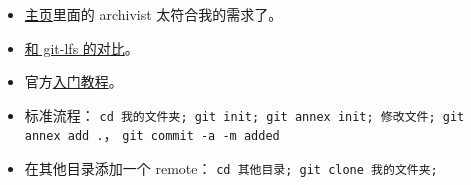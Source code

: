 
\begin{itemize}
\item \href{https://git-annex.branchable.com/}{主页}里面的 archivist 太符合我的需求了。
\item \href{https://stackoverflow.com/questions/39337586/how-do-git-lfs-and-git-annex-differ}{和 git-lfs 的对比}。
\item 官方\href{https://git-annex.branchable.com/walkthrough/}{入门教程}。
\item 标准流程： \verb|cd 我的文件夹; git init; git annex init; 修改文件; git annex add .|， \verb|git commit -a -m added|
\item 在其他目录添加一个 remote： \verb|cd 其他目录; git clone 我的文件夹; |
\end{itemize}

